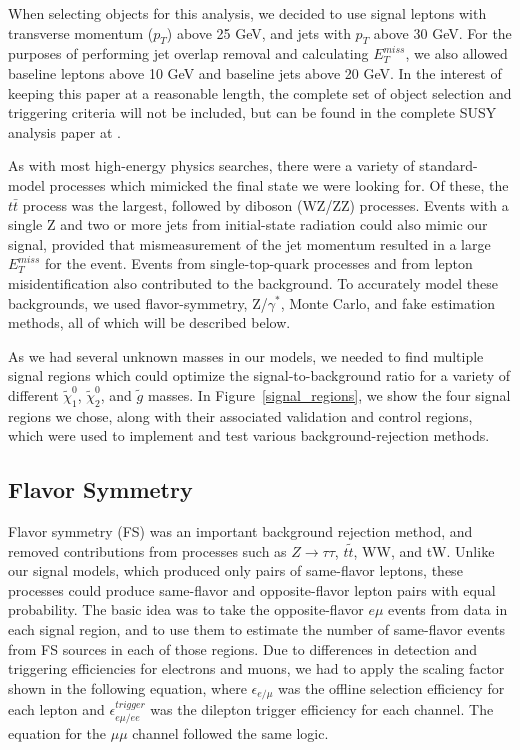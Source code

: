 \documentclass{article}
\begin{document}
When selecting objects for this analysis, we decided to use signal leptons with transverse momentum ($p_T$) above 25 GeV, and jets with $p_T$ above 30 GeV. For the purposes of performing jet overlap removal and calculating $E_T^{miss}$, we also allowed baseline leptons above 10 GeV and baseline jets above 20 GeV. In the interest of keeping this paper at a reasonable length, the complete set of object selection and triggering criteria will not be included, but can be found in the complete SUSY analysis paper at \cite{SUSY_2l2j}.

As with most high-energy physics searches, there were a variety of standard-model processes which mimicked the final state we were looking for. Of these, the $t\bar{t}$ process was the largest, followed by diboson (WZ/ZZ) processes. Events with a single Z and two or more jets from initial-state radiation could also mimic our signal, provided that mismeasurement of the jet momentum resulted in a large $E_T^{miss}$ for the event. Events from single-top-quark processes and from lepton misidentification also contributed to the background. To accurately model these backgrounds, we used flavor-symmetry, Z/$\gamma^*$, Monte Carlo, and fake estimation methods, all of which will be described below.

As we had several unknown masses in our models, we needed to find multiple signal regions which could optimize the signal-to-background ratio for a variety of different $\tilde{\chi}^0_1$, $\tilde{\chi}^0_2$, and $\tilde{g}$ masses. In Figure~\ref{signal_regions}, we show the four signal regions we chose, along with their associated validation and control regions, which were used to implement and test various background-rejection methods.

\subsection*{Flavor Symmetry}

Flavor symmetry (FS) was an important background rejection method, and removed contributions from processes such as $Z\rightarrow\tau\tau$, $t\tilde{t}$, WW, and tW. Unlike our signal models, which produced only pairs of same-flavor leptons, these processes could produce same-flavor and opposite-flavor lepton pairs with equal probability. The basic idea was to take the opposite-flavor $e\mu$ events from data in each signal region, and to use them to estimate the number of same-flavor events from FS sources in each of those regions. Due to differences in detection and triggering efficiencies for electrons and muons, we had to apply the scaling factor shown in the following equation, where $\epsilon_{e/\mu}$ was the offline selection efficiency for each lepton and $\epsilon_{e\mu/ee}^{trigger}$ was the dilepton trigger efficiency for each channel. The equation for the $\mu\mu$ channel followed the same logic.
\end{document}
